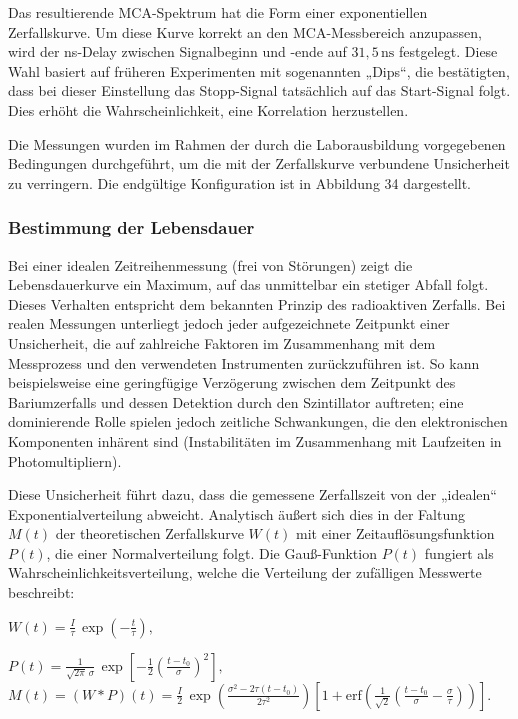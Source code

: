 Das resultierende MCA-Spektrum hat die Form einer exponentiellen Zerfallskurve. Um diese Kurve korrekt an den MCA-Messbereich anzupassen, wird der ns-Delay zwischen Signalbeginn und -ende auf $31,5\,\mathrm{ns}$ festgelegt. Diese Wahl basiert auf früheren Experimenten mit sogenannten „Dips“, die bestätigten, dass bei dieser Einstellung das Stopp-Signal tatsächlich auf das Start-Signal folgt. Dies erhöht die Wahrscheinlichkeit, eine Korrelation herzustellen.

Die Messungen wurden im Rahmen der durch die Laborausbildung vorgegebenen Bedingungen durchgeführt, um die mit der Zerfallskurve verbundene Unsicherheit zu verringern. Die endgültige Konfiguration ist in Abbildung 34 dargestellt.
\subsubsection{Bestimmung der Lebensdauer}
Bei einer idealen Zeitreihenmessung (frei von Störungen) zeigt die Lebensdauerkurve ein Maximum, auf das unmittelbar ein stetiger Abfall folgt. Dieses Verhalten entspricht dem bekannten Prinzip des radioaktiven Zerfalls. Bei realen Messungen unterliegt jedoch jeder aufgezeichnete Zeitpunkt einer Unsicherheit, die auf zahlreiche Faktoren im Zusammenhang mit dem Messprozess und den verwendeten Instrumenten zurückzuführen ist. So kann beispielsweise eine geringfügige Verzögerung zwischen dem Zeitpunkt des Bariumzerfalls und dessen Detektion durch den Szintillator auftreten; eine dominierende Rolle spielen jedoch zeitliche Schwankungen, die den elektronischen Komponenten inhärent sind (Instabilitäten im Zusammenhang mit Laufzeiten in Photomultipliern).

Diese Unsicherheit führt dazu, dass die gemessene Zerfallszeit von der „idealen“ Exponentialverteilung abweicht. Analytisch äußert sich dies in der Faltung $M(t)$ der theoretischen Zerfallskurve $W(t)$ mit einer Zeitauflösungsfunktion $P(t)$, die einer Normalverteilung folgt. Die Gauß-Funktion $P(t)$ fungiert als Wahrscheinlichkeitsverteilung, welche die Verteilung der zufälligen Messwerte beschreibt:

$
W(t) = \frac{I}{\tau}\,\exp\!\left(-\frac{t}{\tau}\right),$

$P(t) = \frac{1}{\sqrt{2\pi}\,\sigma}\,\exp\!\left[-\frac{1}{2}\left(\frac{t - t_0}{\sigma}\right)^2\right],$
$M(t) = (W * P)(t)= \frac{I}{2}\,\exp\!\left(\frac{\sigma^2 - 2\tau(t - t_0)}{2\tau^2}\right)\left[1 + \text{erf}\!\left(\frac{1}{\sqrt{2}}
\left(
\frac{t - t_0}{\sigma} - \frac{\sigma}{\tau}
\right)
\right)
\right].
$

